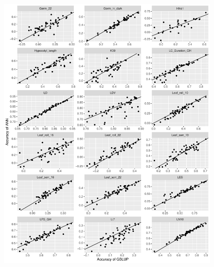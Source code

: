 \begin{figure}[H]
  \centering \includegraphics[height=1.05\textheight, width=1.1\textwidth]{Figures/cor_plots_4}
  \decoRule
 \label{fig:bla}
\end{figure}

